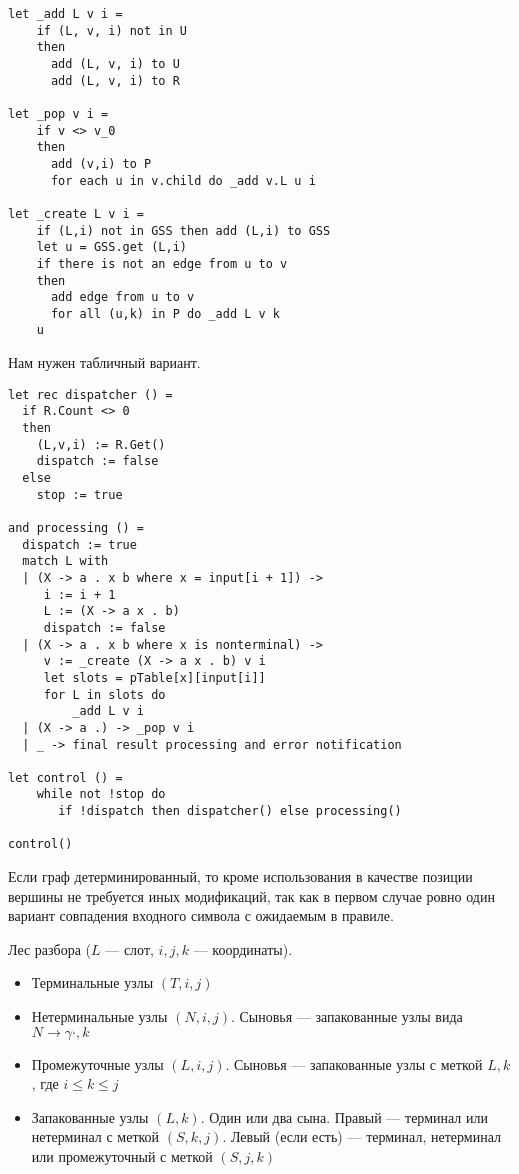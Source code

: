 \documentclass[12pt]{article}  %
\theoremstyle{definition}
\theoremstyle{remark}
\begin{document}
\begin{verbatim}
let _add L v i = 
    if (L, v, i) not in U 
    then 
      add (L, v, i) to U
      add (L, v, i) to R

let _pop v i =
    if v <> v_0
    then
      add (v,i) to P
      for each u in v.child do _add v.L u i

let _create L v i =
    if (L,i) not in GSS then add (L,i) to GSS
    let u = GSS.get (L,i)
    if there is not an edge from u to v
    then
      add edge from u to v
      for all (u,k) in P do _add L v k
    u
\end{verbatim}

Нам нужен табличный вариант.


\begin{verbatim}
let rec dispatcher () = 
  if R.Count <> 0 
  then 
    (L,v,i) := R.Get() 
    dispatch := false 
  else 
    stop := true 

and processing () =  
  dispatch := true 
  match L with
  | (X -> a . x b where x = input[i + 1]) ->
     i := i + 1
     L := (X -> a x . b)
     dispatch := false 
  | (X -> a . x b where x is nonterminal) ->
     v := _create (X -> a x . b) v i
     let slots = pTable[x][input[i]]  
     for L in slots do             
         _add L v i
  | (X -> a .) -> _pop v i
  | _ -> final result processing and error notification

let control () = 
    while not !stop do 
       if !dispatch then dispatcher() else processing() 

control() 

\end{verbatim}


Если граф детерминированный, то кроме использования в качестве позиции вершины не требуется иных модификаций, так как в первом случае ровно один вариант совпадения входного символа с ожидаемым в правиле.


Лес разбора ($L$ --- слот, $i,j,k$ --- координаты).
\begin{itemize}
\item Терминальные узлы $(T,i,j)$
\item Нетерминальные узлы $(N,i,j)$. Сыновья --- запакованные узлы вида $N \rightarrow \gamma \cdot , k$
\item Промежуточные узлы $(L,i,j)$. Сыновья --- запакованные узлы с меткой $L, k$, где $ i \leq k \leq j$ 
\item Запакованные узлы $(L,k)$. Один или два сына. Правый --- терминал или нетерминал с меткой $(S,k,j)$. Левый (если есть) --- терминал, нетерминал или промежуточный с меткой $(S, j, k)$ 
\end{itemize}
\end{document}
